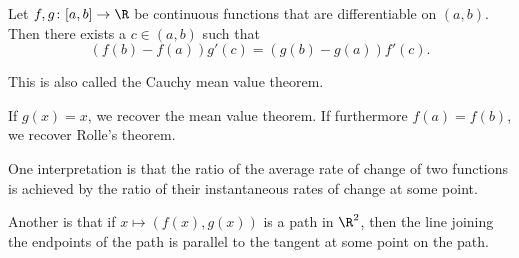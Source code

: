 \begin{theorem*} \label{thm:mvt:general}
    Let $f, g\colon [a, b] \to \R$ be continuous functions that are
    differentiable on $(a, b)$.
    Then there exists a $c \in (a, b)$ such that \[
        (f(b) - f(a)) g'(c) = (g(b) - g(a)) f'(c).
    \]
\end{theorem*}
\begin{remark}
    This is also called the Cauchy mean value theorem.

    If $g(x) = x$, we recover the mean value theorem.
    If furthermore $f(a) = f(b)$, we recover Rolle's theorem.

    One interpretation is that the ratio of the average rate of change of
    two functions is achieved by the ratio of their instantaneous rates of
    change at some point.

    Another is that if $x \mapsto (f(x), g(x))$ is a path in $\R^2$, then
    the line joining the endpoints of the path is parallel to the tangent
    at some point on the path.
\end{remark}
